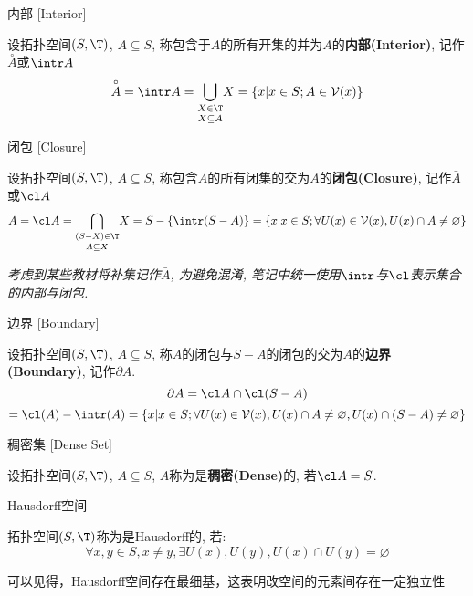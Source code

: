 \documentclass[UTF8]{ctexart}
\begin{document}
            \begin{dfn}
                {内部}
                [Interior]

                设拓扑空间$(S,\T)$, $A\subseteq S$, 称包含于$A$的所有开集的并为$A$的\textbf{内部(Interior)}, 记作$\overset{\circ}{A}$或$\intr A$
                \[\overset{\circ}{A}=\intr A=\underset{X\subseteq A}{\bigcup_{X\in\T}} X=\{x|x\in S; A\in \mathcal{V}(x)\}\]
            \end{dfn}

            \begin{dfn}
                {闭包}
                [Closure]

                设拓扑空间$(S,\T)$, $A\subseteq S$, 称包含$A$的所有闭集的交为$A$的\textbf{闭包(Closure)}, 记作$\bar{A}$或$\cl A$
                \[\bar{A}=\cl A=\underset{A\subseteq X}{\bigcap_{(S-X)\in\T}}X=S-\{\intr(S-A)\}=\{x|x\in S; \forall U(x)\in \mathcal{V}(x), U(x)\cap A\neq\varnothing\}\]
            \end{dfn}

            \textit{\scriptsize *考虑到某些教材将补集记作$\bar{A}$, 为避免混淆, 笔记中统一使用$\intr$与$\cl$表示集合的内部与闭包. }
            
            \begin{dfn}
                {边界}
                [Boundary]

                设拓扑空间$(S,\T)$, $A\subseteq S$, 称$A$的闭包与$S-A$的闭包的交为$A$的\textbf{边界(Boundary)}, 记作$\partial A$. 
                \[\partial A=\cl A\cap\cl(S-A)\]
                \[=\cl(A)-\intr(A)=\{x|x\in S; \forall U(x)\in \mathcal{V}(x), U(x)\cap A\neq\varnothing, U(x)\cap(S-A)\neq\varnothing\}\]
            \end{dfn}
            
            \begin{dfn}
                {稠密集}
                [Dense Set]

                设拓扑空间$(S,\T)$, $A\subseteq S$, $A$称为是\textbf{稠密(Dense)}的, 若$\cl A=S$. 
            \end{dfn}

            \begin{dfn}
                {Hausdorff空间}

                拓扑空间$(S,\T)$称为是Hausdorff的\textbf{}, 若: 
                \[\forall x,y\in S, x\neq y, \exists U(x), U(y), U(x)\cap U(y)=\varnothing\]
                
                可以见得，Hausdorff空间存在最细基，这表明改空间的元素间存在一定独立性
            \end{dfn}
\end{document}
